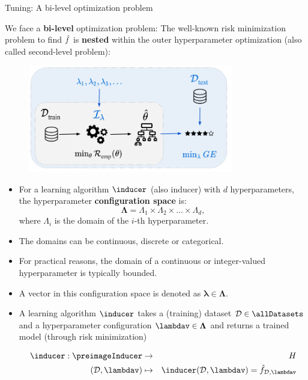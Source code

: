 \documentclass[11pt,compress,t,notes=noshow, xcolor=table]{beamer}
\begin{document}
\begin{vbframe}{Tuning: A bi-level optimization problem} 

\vspace{0.2cm} 

We face a \textbf{bi-level} optimization problem: The well-known risk minimization problem to find $\hat{f}$ is \textbf{nested} within the outer hyperparameter optimization (also called second-level problem):

\begin{center}
\begin{figure}
\includegraphics[width=0.8\textwidth]{figure_man/riskmin_bilevel3.png}
\end{figure}
\end{center}

\framebreak
  \footnotesize
  \begin{itemize}
    \item For a learning algorithm $\inducer$ (also inducer) with $d$ hyperparameters, the hyperparameter \textbf{configuration space} is:
      $$\bm{\Lambda}=\Lambda_{1} \times \Lambda_{2} \times \ldots \times \Lambda_{d},$$
      where $\Lambda_{i}$ is the domain of the $i$-th hyperparameter.
    \item The domains can be continuous, discrete or categorical.
    \item For practical reasons, the domain of a continuous or integer-valued hyperparameter is typically bounded.
    \item A vector in this configuration space is denoted as $\bm{\lambda} \in \bm{\Lambda}$.
    \item A learning algorithm $\inducer$ takes a (training) dataset $\D \in \allDatasets$ and a hyperparameter configuration $\lambdav \in \bm{\Lambda}$ and returns a trained model (through risk minimization)

    \vspace*{-0.2cm}
  \begin{eqnarray*}
    \inducer: \preimageInducer &\to& \Hspace \\
    (\D, \lambdav) &\mapsto& \inducer(\D, \lambdav) = \hat f_{\D, \lambdav}
  \end{eqnarray*}
  \end{itemize}


\end{vbframe}
\end{document}
